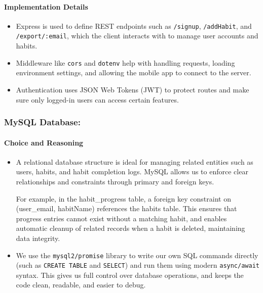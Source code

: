 \paragraph{Implementation Details}
\begin{itemize}
\item Express is used to define REST endpoints such as \texttt{/signup}, \texttt{/addHabit}, and \texttt{/export/:email}, which the client interacts with to manage user accounts and habits.
\item Middleware like \texttt{cors} and \texttt{dotenv} help with handling requests, loading environment settings, and allowing the mobile app to connect to the server.
\item Authentication uses JSON Web Tokens (JWT) to protect routes and make sure only logged-in users can access certain features.
\end{itemize}

\subsubsection{MySQL Database:}

\paragraph{Choice and Reasoning}
\begin{itemize}
  \item A relational database structure is ideal for managing related entities such as users, habits, and habit completion logs. MySQL allows us to enforce clear relationships and constraints through primary and foreign keys.
  
  For example, in the habit\_progress table, a foreign key constraint on (user\_email, habitName) references the habits table. This ensures that progress entries cannot exist without a matching habit, and enables automatic cleanup of related records when a habit is deleted, maintaining data integrity.

  \item We use the \texttt{mysql2/promise} library to write our own SQL commands directly (such as \texttt{CREATE TABLE} and \texttt{SELECT}) and run them using modern \texttt{async/await} syntax. This gives us full control over database operations, and keeps the code clean, readable, and easier to debug.
\end{itemize}

